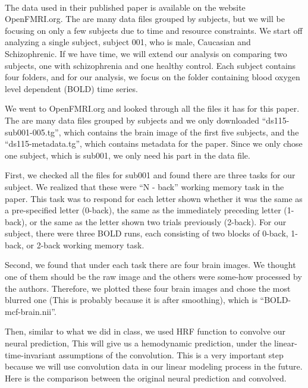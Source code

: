 \documentclass[11pt]{article}
\begin{document}
\paragraph{}
The data used in their published paper is available on the website
OpenFMRI.org. The are many data files grouped by subjects, but we will be
focusing on only a few subjects due to time and resource constraints. We start
off analyzing a single subject, subject 001, who is male, Caucasian and
Schizophrenic. If we have time, we will extend our analysis on comparing two
subjects, one with schizophrenia and one healthy control. Each subject contains
four folders, and for our analysis, we focus on the folder containing blood
oxygen level dependent (BOLD) time series. \par
We went to OpenFMRI.org and looked through all the files it has for this paper. 
The are many data files grouped by subjects and we only downloaded 
``ds115-sub001-005.tg'', which contains the brain image of the first five 
subjects, and the ``ds115-metadata.tg'', which contains metadata for the paper.
Since we only chose one subject, which is sub001, we only need his part in the
data file.\par 
First, we checked all the files for sub001 and found there are three tasks for 
our subject. We realized that these were ``N - back'' working memory task in 
the paper. This task was to respond for each letter shown whether it was the 
same as a pre-specified letter (0-back), the same as the immediately preceding 
letter (1-back), or the same as the letter shown two trials previously (2-back).
For our subject, there were three BOLD runs, each consisting of two blocks of 
0-back, 1-back, or 2-back working memory task. \par
Second, we found that under each task there are four brain images. We thought 
one of them should be the raw image and the others were some-how processed by 
the authors. Therefore, we plotted these four brain images and chose the most 
blurred one (This is probably because it is after smoothing), which is
``BOLD-mcf-brain.nii''.\par
Then, similar to what we did in class, we used HRF function to convolve our 
neural prediction, This will give us a hemodynamic prediction, under the 
linear-time-invariant assumptions of the convolution. This is a very important 
step because we will use convolution data in our linear modeling process in the
future. Here is the comparison between the original neural prediction and 
convolved.
\end{document}
